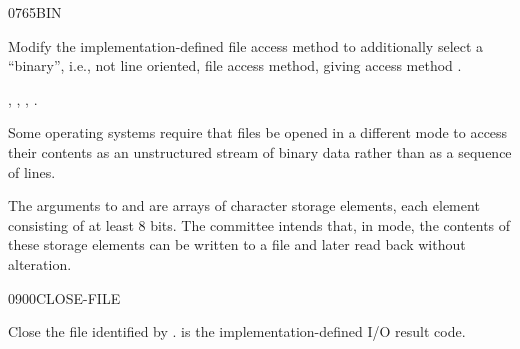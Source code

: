 \vspace*{-2ex}
\begin{worddef}{0765}{BIN}
\item {}

	Modify the implementation-defined file access method
	 to additionally select a \linebreak
	``binary'', i.e., not line oriented, file access method,
	giving access method .

\see {},
	,
	,
	.

	\begin{rationale} %
		Some operating systems require that files be opened in a
		different mode to access their contents as an unstructured
		stream of binary data rather than as a sequence of lines.

		The arguments to  and  are
		arrays of character storage elements, each element consisting
		of at least 8 bits. The committee intends that, in
		 mode, the contents of these storage elements can be
		written to a file and later read back without alteration.
	\end{rationale}
\end{worddef}

\vspace*{-2ex}
\begin{worddef}{0900}{CLOSE-FILE}
\item {}

	Close the file identified by .  is the
	implementation-defined I/O result code.
\end{worddef}


